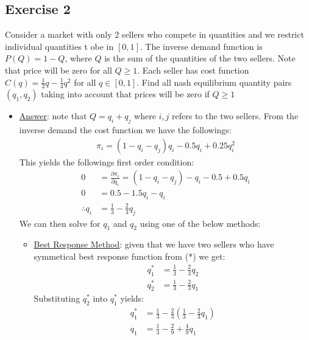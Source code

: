 \documentclass{article}
\begin{document}
\subsection{Exercise 2}
 Consider a market with only 2 sellers who compete in quantities and we restrict individual quantities t obe in $[0,1]$. The inverse demand function is $P(Q) = 1 - Q$, where $Q$ is the sum of the quantities of the two sellers. Note that price will be zero for all $Q \geq 1$. Each seller has cost function $C(q) = \tfrac{1}{2}q - \tfrac{1}{4}q^{2}$ for all $q \in [0,1]$. Find all nash equilibrium quantity pairs $(q_{1}, q_{2})$ taking into account that prices will  be zero if $Q \geq 1$ \par \vspace{0.3em}
  \begin{itemize}
    \item  \underline{Answer}: note that $Q = q_{i} + q_{j}$ where $i,j$ refers to the two sellers. From the inverse demand the cost function we have the followings:
    \begin{gather*}
      \pi_{i} = (1 - q_{i} - q_{j})q_{i} - 0.5 q_{i} + 0.25 q_{i}^{2}
    \end{gather*}
    This yields the followings first order condition:
    \begin{align*}
      0 &= \frac{\partial \pi_{i}}{\partial q_{i}} = (1-q_{i}-q_{j}) - q_{i} - 0.5 + 0.5q_{i} \\
      0 &= 0.5 - 1.5q_{i} - q_{i} \\
      \therefore q_{i} &= \frac{1}{3} - \frac{2}{3} q_{j} \ \tag{*}
    \end{align*}
    We can then solve for $q_{1}$ and $q_{2}$ using one of the below methods:
    \begin{itemize}
      \item  \underline{Best Response Method}: given that we have two sellers who have symmetical best response function from (*) we get:
      \begin{align*}
        q_{1}^{*} &= \frac{1}{3} - \frac{2}{3} q_{2} \\
        q_{2}^{*} &= \frac{1}{3} - \frac{2}{3} q_{1}
      \end{align*}
      Substituting $q_{2}^{*}$ into $q_{1}^{*}$ yields:
      \begin{align*}
        q_{1}^{*} &= \frac{1}{3} - \frac{2}{3}(\frac{1}{3} - \frac{2}{3}q_{1}) \\
        q_{1} &= \frac{1}{3} - \frac{2}{9} + \frac{4}{9}q_{1} \\

\end{align*}
\end{itemize}
\end{itemize}
\end{document}
